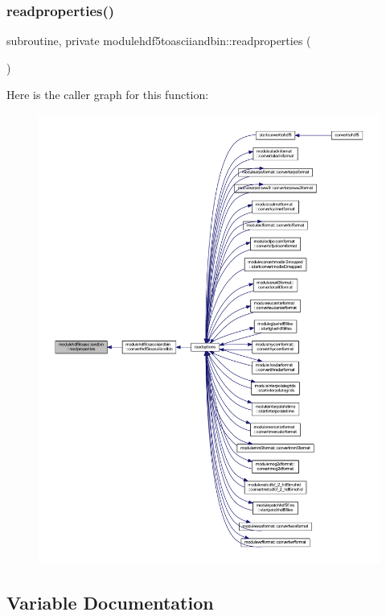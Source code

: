 \subsubsection{\texorpdfstring{readproperties()}{readproperties()}}
{\footnotesize\ttfamily subroutine, private modulehdf5toasciiandbin\+::readproperties (\begin{DoxyParamCaption}{ }\end{DoxyParamCaption})\hspace{0.3cm}{\ttfamily [private]}}

Here is the caller graph for this function\+:\nopagebreak
\begin{figure}[H]
\begin{center}
\leavevmode
\includegraphics[width=350pt]{namespacemodulehdf5toasciiandbin_afad7dca87cff93eae4b5e8a18fdbbec3_icgraph}
\end{center}
\end{figure}


\subsection{Variable Documentation}
\mbox{\label{namespacemodulehdf5toasciiandbin_af67d5747ca401341575f80bd92bffd79}} 
